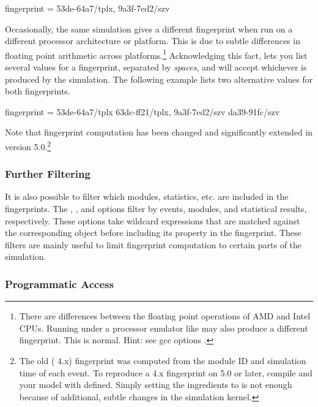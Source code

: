 \begin{inifile}
fingerprint = 53de-64a7/tplx, 9a3f-7ed2/szv
\end{inifile}

Occasionally, the same simulation gives a different fingerprint when run on
a different processor architecture or platform. This is due to subtle
differences in floating point arithmetic across platforms.\footnote{There
are differences between the floating point operations of AMD and Intel
CPUs. Running under a processor emulator like  may also
produce a different fingerprint. This is normal. Hint: see gcc options
.} Acknowledging this fact, {\opp} lets you list
several values for a fingerprint, separated by \textit{spaces}, and will
accept whichever is produced by the simulation. The following example lists
two alternative values for both fingerprints.

\begin{inifile}
fingerprint = 53de-64a7/tplx 63dc-ff21/tplx, 9a3f-7ed2/szv da39-91fc/szv
\end{inifile}

Note that fingerprint computation has been changed and significantly
extended in {\opp} version 5.0.\footnote{The old ({\opp} 4.x) fingerprint
was computed from the module ID and simulation time of each event. To
reproduce a 4.x fingerprint on {\opp} 5.0 or later, compile {\opp} and your
model with  defined. Simply setting the
ingredients to  is not enough because of additional, subtle changes
in the simulation kernel.}


\subsubsection{Further Filtering}
\label{sec:testing:fingerprint-further-filtering}

It is also possible to filter which modules, statistics, etc. are included
in the fingerprints. The ,
, and  options
filter by events, modules, and statistical results, respectively. These
options take wildcard expressions that are matched against the
corresponding object before including its property in the fingerprint.
These filters are mainly useful to limit fingerprint computation to certain
parts of the simulation.

\subsubsection{Programmatic Access}
\label{sec:testing:fingerprint-programmatic-access}

